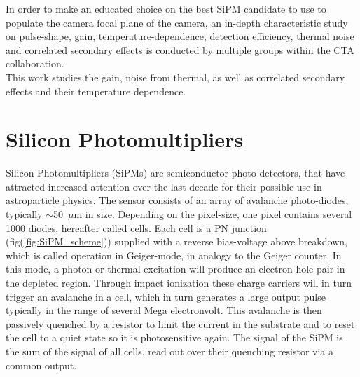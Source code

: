 \documentclass[12pt,article,type=msc,colorback,accentcolor=tud9c]{tudthesis}
\begin{document}
In order to make an educated choice on the best SiPM candidate to use to populate the camera focal plane of the camera, an in-depth characteristic study on pulse-shape, gain, temperature-dependence, detection efficiency, thermal noise and correlated secondary effects is conducted by multiple groups within the CTA collaboration.\\

This work studies the gain, noise from thermal, as well as correlated secondary effects and their temperature dependence. 





\clearpage
\section{\Large Silicon Photomultipliers}
\label{sec:SiPM}


Silicon Photomultipliers (SiPMs) are semiconductor photo detectors, that have attracted increased attention over the last decade for their possible use in astroparticle physics. The sensor consists of an array of avalanche photo-diodes, typically $\sim$50~$\mu$m in size. Depending on the pixel-size, one pixel contains several 1000 diodes, hereafter called cells. Each cell is a PN junction (fig(\ref{fig:SiPM_scheme})) supplied with a reverse bias-voltage above breakdown, which is called operation in Geiger-mode, in analogy to the Geiger counter. In this mode, a photon or thermal excitation will produce an electron-hole pair in the depleted region. Through impact ionization these charge carriers will in turn trigger an avalanche in a cell, which in turn generates a large output pulse typically in the range of several Mega electronvolt. This avalanche is then passively quenched by a resistor to limit the current in the substrate and to reset the cell to a quiet state so it is photosensitive again. The signal of the SiPM is the sum of the signal of all cells, read out over their quenching resistor via a common output.\\
\end{document}
